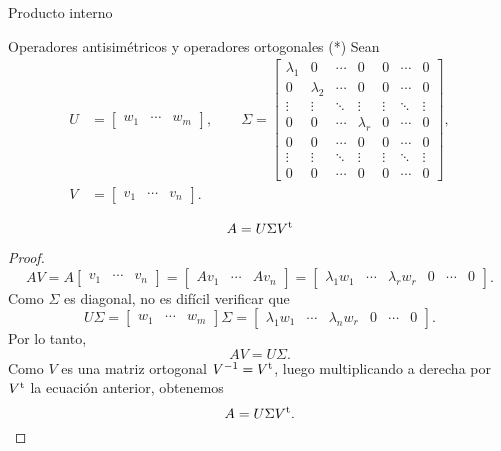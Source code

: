\begin{chapter}{Producto interno}
\begin{section}{Operadores antisim\'etricos y operadores ortogonales (*)}
        Sean
        \begin{align*}
        U &= \begin{bmatrix}
        w_1 & \cdots &  w_m
        \end{bmatrix},\qquad 
        \Sigma = \begin{bmatrix}
        \lambda_{1} & 0 & \cdots & 0 & 0 & \cdots & 0 \\ 
        0 & \lambda_{2} & \cdots & 0 & 0 & \cdots & 0 \\ 
        \vdots & \vdots & \ddots & \vdots & \vdots & \ddots & \vdots \\ 
        0 & 0 & \cdots & \lambda_{r} & 0 & \cdots & 0 \\  
        0 & 0 & \cdots & 0 & 0 & \cdots & 0 \\ 
        \vdots & \vdots & \ddots & \vdots & \vdots & \ddots & \vdots \\ 
        0 & 0 & \cdots & 0 & 0 & \cdots & 0 
        \end{bmatrix},\\
        V &= \begin{bmatrix}
        v_1 & \cdots & v_n
        \end{bmatrix}. 
        \end{align*}
        
        
        
        
        
        \begin{teorema}
            $$A = U\Sigma V^{{\operatorname{t}}}$$ 
        \end{teorema}
        \begin{proof}
            $$
            AV = A \begin{bmatrix}
            v_1 & \cdots & v_n
            \end{bmatrix}
            =
             \begin{bmatrix}
            Av_1 & \cdots & Av_n
            \end{bmatrix}
            =
            \begin{bmatrix}
            \lambda_1 w_1& \cdots & \lambda_r w_r& 0 &\cdots &0
            \end{bmatrix}.
            $$
            Como $\Sigma$  es diagonal, no es difícil verificar que 
            $$
            U\Sigma = \begin{bmatrix}
            w_1 & \cdots &  w_m
            \end{bmatrix}\Sigma = \begin{bmatrix}
            \lambda_1 w_1& \cdots & \lambda_n w_r& 0 &\cdots &0
            \end{bmatrix}.
            $$
            Por lo tanto,
            $$
            AV = U\Sigma.
            $$
            Como $V$ es una matriz ortogonal $V^{-1}= V^{{\operatorname{t}}}$, luego  multiplicando  a derecha por $V^{{\operatorname{t}}}$ la ecuación anterior, obtenemos
            $$
            A = U\Sigma V^{{\operatorname{t}}}.
            $$    
        \end{proof}
        

\end{section}
\end{chapter}
